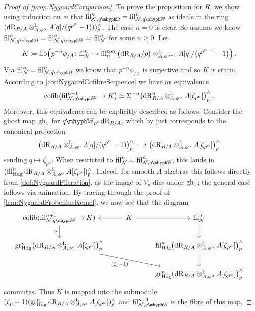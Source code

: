 \documentclass[DIV=12,numbers=enddot,leqno,bibliography=totoc]{scrartcl}
\begin{document}
\begin{proof}[Proof of \cref{prop:NygaardComparison}]
		To prove the proposition for $R$, we show using induction on~$n$ that $ \fil_{\Nn,  \qOmega}^n= \fil_{\Nn, \qIW}^n$ as ideals in the ring $(\mathrm{dR}_{R/A}\otimes^{\mathrm{L}}_{A,\phi^\alpha}A[q]/(q^{p^\alpha}-1)))_p^\wedge$. The case $n=0$ is clear. So assume we know $ \fil_{\Nn,  \qOmega}^n= \fil_{\Nn, \qIW}^n\eqqcolon  \fil_\Nn^n$ for some $n\geqslant 0$. Let
		\begin{equation*}
			K\coloneqq \fib\left(p^{-n}\phi_{/A}\colon  \fil_\Nn^n\rightarrow  \fil_n^\mathrm{conj}\bigl(\deRham_{R/A}/p\bigr)\lotimes_{A,\phi^{\alpha-1}}A[q]/\bigl(q^{p^{\alpha-1}}-1\bigr)\right)\,.
		\end{equation*}
		Via $ \fil_\Nn^n= \fil_{\Nn,  \qOmega}^n$ we know that $p^{-n}\phi_{/A}$ is surjective and so $K$ is static. According to \cref{cor:NygaardCofibreSequence} we have an equivalence
		\begin{equation*}
			\cofib\bigl( \fil_{\Nn, \qIW}^{n+1}\rightarrow K\bigr)\simeq \Sigma^{-n}\bigl(\deRham_{R/A}^n\lotimes_{A,\phi^\alpha}A[\zeta_{p^\alpha}]\bigr)_p^\complete\,.
		\end{equation*}
		Moreover, this equivalence can be explicitly described as follows: Consider the ghost map $\operatorname{gh}_1$ for $\qIW_{p^\alpha}\deRham_{R/A}$, which by \cite[Proposition~]{qWitt} just corresponds to the canonical projection 
		\begin{equation*}
			\bigl(\mathrm{dR}_{R/A}\otimes^{\mathrm{L}}_{A,\phi^\alpha}A[q]/(q^{p^\alpha}-1)\bigr)_p^\wedge\longrightarrow \bigl(\mathrm{dR}_{R/A}\otimes^{\mathrm{L}}_{A,\phi^\alpha}A[\zeta_{p^\alpha}]\bigr)_p^\wedge
		\end{equation*}
		sending $q\mapsto \zeta_{p^\alpha}$. When restricted to $ \fil_\Nn^n= \fil_{\Nn, \qIW}^n$, this lands in $( \operatorname{fil}_{\mathrm{Hdg}}^n\mathrm{dR}_{R/A}\otimes^{\mathrm{L}}_{A,\phi^\alpha}A[\zeta_{p^\alpha}])_p^\wedge$. Indeed, for smooth $A$-algebras this follows directly from \cref{def:NygaardFiltration}, as the image of $V_p$ dies under $\operatorname{gh}_1$; the general case follows via animation. By tracing through the proof of \cref{lem:NygaardFrobeniusKernel}, we now see that the diagram
		\begin{equation*}
			\begin{tikzcd}
				\cofib( \fil_{\Nn, \qIW}^{n+1}\rightarrow K)\dar["\simeq"'] & K\lar\rar &  \fil_\Nn^n\dar\\
				\gr_{\Hodge}^n\bigl(\deRham_{R/A}\lotimes_{A,\phi^\alpha}A[\zeta_{p^\alpha}]\bigr)_p^\complete\ar[drr,"(\zeta_p-1)"'] & &  \fil_{\Hodge}^n\bigl(\deRham_{R/A}\lotimes_{A,\phi^\alpha}A[\zeta_{p^\alpha}]\bigr)_p^\complete\dar\\
				& & \gr_{\Hodge}^n\bigl(\deRham_{R/A}\lotimes_{A,\phi^\alpha}A[\zeta_{p^\alpha}]\bigr)_p^\complete
			\end{tikzcd}
		\end{equation*}
		commutes. Thus $K$ is mapped into the submodule $(\zeta_p-1)(\operatorname{gr}_{\mathrm{Hdg}}^n\mathrm{dR}_{R/A}\otimes^{\mathrm{L}}_{A,\phi^\alpha}A[\zeta_{p^\alpha}])_p^\wedge$ and $ \fil_{\Nn, \qIW}^{n+1}$ is the fibre of this map.
		

\end{proof}
\end{document}

